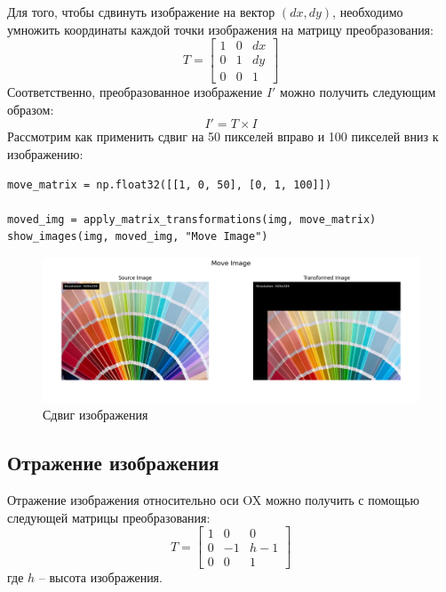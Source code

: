 Для того, чтобы сдвинуть изображение на вектор $(dx, dy)$, необходимо умножить координаты каждой точки изображения на матрицу преобразования:
\begin{equation}
    T = \begin{bmatrix}
        1 & 0 & dx \\
        0 & 1 & dy \\
        0 & 0 & 1
    \end{bmatrix}
\end{equation}
Соответственно, преобразованное изображение $I'$ можно получить следующим образом:
\begin{equation}
    I' = T \times I
\end{equation}
Рассмотрим как применить сдвиг на 50 пикселей вправо и 100 пикселей вниз к изображению:

\begin{lstlisting}[style=python_white, caption={Исходный код для сдвига изображения}]
move_matrix = np.float32([[1, 0, 50], [0, 1, 100]])

moved_img = apply_matrix_transformations(img, move_matrix)
show_images(img, moved_img, "Move Image")
\end{lstlisting}

\begin{figure}[ht]
    \includegraphics[width=\textwidth]{../results/Move Image.png}
    \caption{Сдвиг изображения}
    \label{fig:move_image}
\end{figure}

\subsection{Отражение изображения}

Отражение изображения относительно оси OX можно получить с помощью следующей матрицы преобразования:
\begin{equation}
T = \begin{bmatrix}
    1 & 0 & 0 \\
    0 & -1 & h - 1 \\
    0 & 0 & 1
\end{bmatrix}
\end{equation}
где $h$ -- высота изображения.

